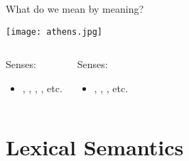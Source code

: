 \documentclass{beamer}
\newcommand{\subonetwo}{What do we mean by meaning?}
\newcommand{\subtwoone}{}
\begin{document}

      \begin{frame}{\subonetwo}
        \begin{center}
          \texttt{[image: athens.jpg]}
        \end{center}
        \begin{columns}
            \begin{block}{}
              Senses:
              \begin{itemize}
                \item {}, , , , etc.
              \end{itemize}
            \end{block}
            \begin{block}{}
              Senses:
              \begin{itemize}
                \item {}, , , etc.
              \end{itemize}
            \end{block}
        \end{columns}
      \end{frame}

  \section{Lexical Semantics}
    \subsection{\subtwoone}
      \begin{frame}{\subtwoone}

      \end{frame}
\end{document}
